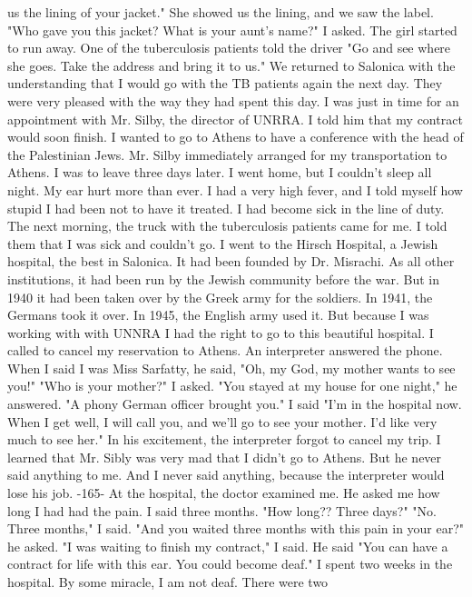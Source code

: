 us the lining of your jacket." She showed us the lining, and we saw the label. 
"Who gave you this jacket? What is your aunt's name?" I asked. The girl started 
to run away. One of the tuberculosis patients told the driver "Go and see where she goes. Take 
the address and bring it to us." 
We returned to Salonica with the understanding that I would go with the TB patients
again the next day. They were very pleased with the way they had spent this day. I 
was just in time for an appointment with Mr. Silby, the director of UNRRA. I told him 
that my contract would soon finish. I wanted to go to Athens to have a conference with 
the head of the Palestinian Jews. Mr. Silby immediately arranged for my transportation 
to Athens. I was to leave three days later. 
I went home, but I couldn't sleep all night. My ear hurt more than ever. I had a 
very high fever, and I told myself how stupid I had been not to have it treated. I had 
become sick in the line of duty. The next morning, the truck with the tuberculosis patients came 
for me. I told them that I was sick and couldn't go. 
I went to the Hirsch Hospital, a Jewish hospital, the best in Salonica. It had 
been founded by Dr. Misrachi. As all other institutions, it had been run by the Jewish 
community before the war. But in 1940 it had been taken over by the Greek army for the
soldiers. In 1941, the Germans took it over. In 1945, the English army used it. But 
because I was working with with UNNRA I had the right to go to this beautiful hospital. 
I called to cancel my reservation to Athens. An interpreter answered the phone. 
When I said I was Miss Sarfatty, he said, "Oh, my God, my mother wants to see you!" 
"Who is your mother?" I asked. 
"You stayed at my house for one night," he answered. "A phony German officer 
brought you." 
I said "I'm in the hospital now. When I get well, I will call you, and we'll go 
to see your mother. I'd like very much to see her." In his excitement, the interpreter 
forgot to cancel my trip. I learned that Mr. Sibly was very mad that I didn't go to 
Athens. But he never said anything to me. And I never said anything, because the interpreter would lose his job.
-165- 
At the hospital, the doctor examined me. He asked me how long I had had the pain. 
I said three months. 
"How long?? Three days?" 
"No. Three months," I said. 
"And you waited three months with this pain in your ear?" he asked. 
"I was waiting to finish my contract," I said. 
He said "You can have a contract for life with this ear. You could become deaf." 
I spent two weeks in the hospital. By some miracle, I am not deaf. There were two 
